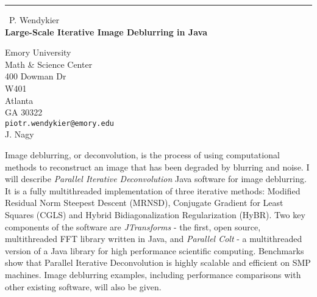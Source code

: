 \documentclass{report}
\begin{document}
\begin{center}
\rule{6in}{1pt} \
{\large P. Wendykier \\
{\bf Large-Scale Iterative Image Deblurring in Java}}

Emory University \\ Math & Science Center \\ 400 Dowman Dr  \\ W401 \\ Atlanta \\ GA 30322
\\
{\tt piotr.wendykier@emory.edu}\\
J. Nagy\end{center}

Image deblurring, or deconvolution, is the process of using computational
methods to reconstruct an image that has been degraded by blurring
and noise. I will describe \emph{Parallel Iterative Deconvolution}
Java software for image deblurring. It is a fully multithreaded implementation
of three iterative methods: Modified Residual Norm Steepest Descent
(MRNSD), Conjugate Gradient for Least Squares (CGLS) and Hybrid Bidiagonalization
Regularization (HyBR). Two key components of the software are \emph{JTransforms}
- the first, open source, multithreaded FFT library written in Java,
and \emph{Parallel Colt} - a multithreaded version of a Java library
for high performance scientific computing. Benchmarks show that Parallel
Iterative Deconvolution is highly scalable and efficient on SMP machines.
Image deblurring examples, including performance comparisons with
other existing software, will also be given.
\end{document}
